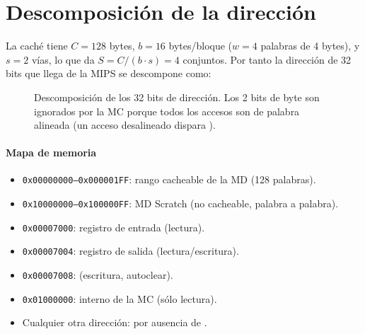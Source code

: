 \section{Descomposici\'on de la direcci\'on}
\label{sec:addr}

La cach\'e tiene $C = 128$ bytes, $b = 16$ bytes/bloque ($w = 4$ palabras de 4 bytes), y
$s = 2$ v\'ias, lo que da $S = C/(b\cdot s) = 4$ conjuntos. Por tanto la direcci\'on de
32 bits que llega de la MIPS se descompone como:

\begin{figure}[htbp]
\centering
{}
\caption{Descomposici\'on de los 32 bits de direcci\'on. Los 2 bits de byte son ignorados
por la MC porque todos los accesos son de palabra alineada (un acceso desalineado
dispara ).}
\label{fig:addr}
\end{figure}

\paragraph{Mapa de memoria}
\begin{itemize}[leftmargin=1.2em]
  \item \texttt{0x00000000--0x000001FF}: rango cacheable de la MD (128 palabras).
  \item \texttt{0x10000000--0x100000FF}: MD Scratch (no cacheable, palabra a palabra).
  \item \texttt{0x00007000}: registro de entrada  (lectura).
  \item \texttt{0x00007004}: registro de salida  (lectura/escritura).
  \item \texttt{0x00007008}:  (escritura, autoclear).
  \item \texttt{0x01000000}:  interno de la MC (s\'olo lectura).
  \item Cualquier otra direcci\'on:  por ausencia de .
\end{itemize}
